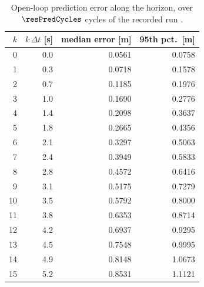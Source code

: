 \begin{table}[htbp]
  \centering
  \small
  \caption{Open-loop prediction error along the horizon, over $\resPredCycles$ cycles of the recorded run \resBag.}
  \label{res:tab:pred}
  \begin{tabular}{rrrr}
    \toprule
    $k$ & $k\,\Delta t$ [s] & median error [m] & 95th pct.\ [m] \\
    \midrule
    0 & 0.0 & 0.0561 & 0.0758 \\
    1 & 0.3 & 0.0718 & 0.1578 \\
    2 & 0.7 & 0.1185 & 0.1976 \\
    3 & 1.0 & 0.1690 & 0.2776 \\
    4 & 1.4 & 0.2098 & 0.3637 \\
    5 & 1.8 & 0.2665 & 0.4356 \\
    6 & 2.1 & 0.3297 & 0.5063 \\
    7 & 2.4 & 0.3949 & 0.5833 \\
    8 & 2.8 & 0.4572 & 0.6416 \\
    9 & 3.1 & 0.5175 & 0.7279 \\
    10 & 3.5 & 0.5792 & 0.8000 \\
    11 & 3.8 & 0.6353 & 0.8714 \\
    12 & 4.2 & 0.6937 & 0.9295 \\
    13 & 4.5 & 0.7548 & 0.9995 \\
    14 & 4.9 & 0.8148 & 1.0673 \\
    15 & 5.2 & 0.8531 & 1.1121 \\
    \bottomrule
  \end{tabular}
\end{table}

